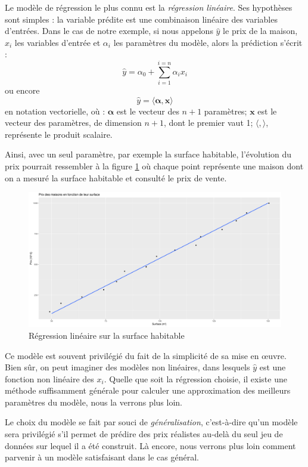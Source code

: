 Le modèle de régression le plus connu est la \emph{régression linéaire}. Ses hypothèses sont simples : la variable prédite est une combinaison linéaire des variables d'entrées. Dans le cas de notre exemple, si nous appelons \(\hat y\) le prix de la maison, \(x_i\) les variables d'entrée et \(\alpha_i\) les paramètres du modèle, alors la prédiction s'écrit :
\[\hat{y} = \alpha_0 + \sum_{i = 1}^{i = n}{\alpha_i x_i}\]
ou encore 
\begin{equation} \label{eq:reg_lin}
\hat{y} = \langle \boldsymbol{\alpha}, \boldsymbol{x} \rangle
\end{equation}
en notation vectorielle, où : \(\boldsymbol{\alpha}\) est le vecteur des \(n + 1\) paramètres; \(\boldsymbol{x}\) est le vecteur des paramètres, de dimension \(n + 1\), dont le premier vaut 1;  \(\langle, \rangle\), représente le produit scalaire.

Ainsi, avec un seul paramètre, par exemple la surface habitable, l'évolution du prix pourrait ressembler à la figure \ref{fig:reg_lin} où chaque point représente une maison dont on a mesuré la surface habitable et consulté le prix de vente.

\begin{figure}
\centering
\includegraphics[width=\textwidth]{img/reg_lin.png}
\caption{Régression linéaire sur la surface habitable}
\label{fig:reg_lin}
\end{figure}

Ce modèle est souvent privilégié du fait de la simplicité de sa mise en œuvre. Bien sûr, on peut imaginer des modèles non linéaires, dans lesquels \(\hat y\) est une fonction non linéaire des \(x_i\). Quelle que soit la régression choisie, il existe une méthode suffisamment générale pour calculer une approximation des meilleurs paramètres du modèle, nous la verrons plus loin.

Le choix du modèle se fait par souci de \emph{généralisation}, c'est-à-dire qu'un modèle sera privilégié s'il permet de prédire des prix réalistes au-delà du seul jeu de données sur lequel il a été construit. Là encore, nous verrons plus loin comment parvenir à un modèle satisfaisant dans le cas général. 

